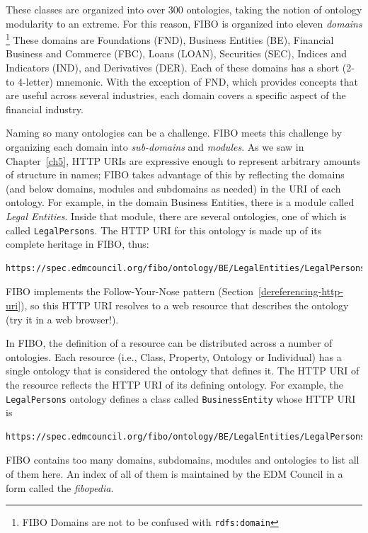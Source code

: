 These classes are organized into over 300 ontologies, taking the notion of ontology modularity to an extreme.  
For this reason, FIBO is organized into eleven \emph{domains} \footnote{FIBO Domains are not to be confused with \texttt{rdfs:domain}}
These domains are Foundations (FND), Business Entities (BE), Financial Business and Commerce (FBC), Loans (LOAN), Securities (SEC), 
Indices and Indicators (IND), and  Derivatives (DER).  Each of these domains has a short (2- to 4-letter) mnemonic.   With the exception of FND, which provides concepts that are useful across several industries, each domain covers a specific aspect of the
financial industry.

Naming so many ontologies can be a challenge.  FIBO meets this challenge by organizing each domain 
into \emph{sub-domains} and \emph{modules}. 
As we saw in Chapter~\ref{ch5}, HTTP URIs are expressive enough to represent arbitrary amounts of structure in names; 
FIBO takes advantage of this by reflecting the domains (and below domains, modules  and subdomains as needed) in the URI 
of each ontology.  For example, in the domain Business Entities, there is a module called \emph{Legal Entities}.  Inside that 
module, there are several ontologies, one of which is called \texttt{LegalPersons}.  The HTTP URI for this ontology
is made up of its complete heritage in FIBO, thus:

\begin{lstlisting}
https://spec.edmcouncil.org/fibo/ontology/BE/LegalEntities/LegalPersons/
\end{lstlisting}

FIBO implements the Follow-Your-Nose pattern (Section~\ref{dereferencing-http-uri}), so this HTTP URI resolves to 
a web resource that describes the ontology (try it in a web browser!). 

In FIBO, the definition of a resource can be distributed across a number of ontologies.  Each resource 
(i.e., Class, Property, Ontology or Individual) has a single ontology that is considered the ontology
that defines it.  The HTTP URI of the resource reflects the HTTP URI of its defining ontology.  For example,  the \texttt{LegalPersons}
ontology defines  a class called \texttt{BusinessEntity} whose HTTP URI is 

\begin{lstlisting}
https://spec.edmcouncil.org/fibo/ontology/BE/LegalEntities/LegalPersons/BusinessEntity
\end{lstlisting}

FIBO contains too many domains, subdomains, modules and ontologies to list all of them here. An index of all of them
is maintained by the EDM Council in a form called 
the \emph{fibopedia}\cite{fibopedia}.  

